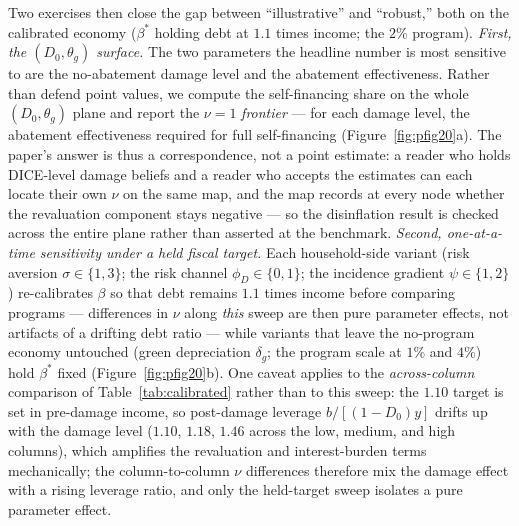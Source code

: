 \documentclass[12pt]{article}
\begin{document}
Two exercises then close the gap between ``illustrative'' and ``robust,''
both on the calibrated economy ($\beta^{*}$ holding debt at $1.1$ times
income; the $2\%$ program). \emph{First, the $(D_0,\theta_g)$ surface.}
The two parameters the headline number is most sensitive to are the
no-abatement damage level and the abatement effectiveness. Rather than
defend point values, we compute the self-financing share on the whole
$(D_0,\theta_g)$ plane and report the $\nu=1$ \emph{frontier} --- for each
damage level, the abatement effectiveness required for full self-financing
(Figure~\ref{fig:pfig20}a). The paper's answer is thus a correspondence,
not a point estimate: a reader who holds DICE-level damage beliefs and a
reader who accepts the \citet{bilalkanzig2024} estimates can each locate
their own $\nu$ on the same map, and the map records at every node whether
the revaluation component stays negative --- so the disinflation result is
checked across the entire plane rather than asserted at the benchmark.
\emph{Second, one-at-a-time sensitivity under a held fiscal target.} Each
household-side variant (risk aversion $\sigma\in\{1,3\}$; the risk channel
$\phi_D\in\{0,1\}$; the incidence gradient $\psi\in\{1,2\}$) re-calibrates
$\beta$ so that debt remains $1.1$ times income before comparing programs
--- differences in $\nu$ along \emph{this} sweep are then pure parameter
effects, not artifacts of a drifting debt ratio --- while variants that
leave the no-program economy untouched (green depreciation $\delta_g$; the
program scale at $1\%$ and $4\%$) hold $\beta^{*}$ fixed
(Figure~\ref{fig:pfig20}b). One caveat applies to the \emph{across-column}
comparison of Table~\ref{tab:calibrated} rather than to this sweep: the
$1.10$ target is set in pre-damage income, so post-damage leverage
$b/[(1-D_0)y]$ drifts up with the damage level ($1.10$, $1.18$, $1.46$
across the low, medium, and high columns), which amplifies the
revaluation and interest-burden terms mechanically; the column-to-column
$\nu$ differences therefore mix the damage effect with a rising leverage
ratio, and only the held-target sweep isolates a pure parameter effect.
\end{document}

